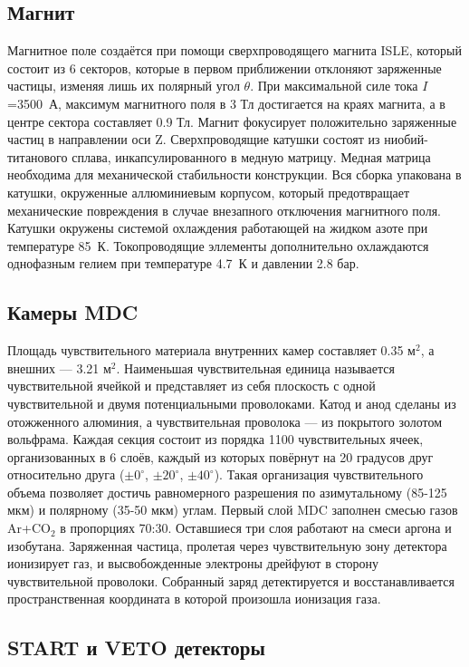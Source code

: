 \subsection{ Магнит }

Магнитное поле создаётся при помощи сверхпроводящего магнита ISLE, который состоит из 6 секторов, которые в первом приближении отклоняют заряженные частицы, изменяя лишь их полярный угол $\theta$.
При максимальной силе тока $I$=3500~А, максимум магнитного поля в 3 Тл достигается на краях магнита, а в центре сектора составляет 0.9 Тл.
Магнит фокусирует положительно заряженные частиц в направлении оси Z.
Сверхпроводящие катушки состоят из ниобий-титанового сплава, инкапсулированного в медную матрицу.
Медная матрица необходима для механической стабильности конструкции.
Вся сборка упакована в катушки, окруженные аллюминиевым корпусом, который предотвращает механические повреждения в случае внезапного отключения магнитного поля.
Катушки окружены системой охлаждения работающей на жидком азоте при температуре 85~К.
Токопроводящие эллементы дополнительно охлаждаются однофазным гелием при температуре 4.7~К и давлении 2.8 бар.

\subsection{ Камеры MDC }

Площадь чувствительного материала внутренних камер составляет 0.35 м$^2$, а внешних --- 3.21 м$^2$.
Наименьшая чувствительная единица называется чувствительной ячейкой и представляет из себя плоскость с одной чувствительной и двумя потенциальными проволоками.
Катод и анод сделаны из отожженного алюминия, а чувствительная проволока --- из покрытого золотом вольфрама.
Каждая секция состоит из порядка 1100 чувствительных ячеек, организованных в 6 слоёв, каждый из которых повёрнут на 20 градусов друг относительно друга ($\pm0^{\circ}$, $\pm20^{\circ}$, $\pm40^{\circ}$).
Такая организация чувствительного объема позволяет достичь равномерного разрешения по азимутальному (85-125 мкм) и полярному (35-50 мкм) углам.
Первый слой MDC заполнен смесью газов Ar+CO$_{2}$ в пропорциях 70:30.
Оставшиеся три слоя работают на смеси аргона и изобутана. 
Заряженная частица, пролетая через чувствительную зону детектора ионизирует газ, и высвобожденные электроны дрейфуют в сторону чувствительной проволоки.
Собранный заряд детектируется и восстанавливается пространственная координата в которой произошла ионизация газа.

\subsection{START и VETO детекторы}


